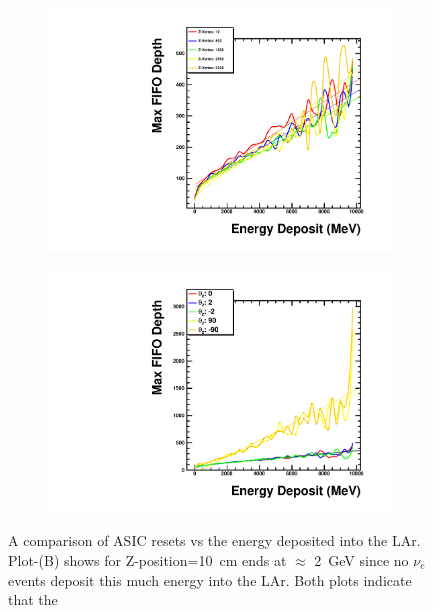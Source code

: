 \begin{figure}
\centering
\begin{subfigure}{.5\textwidth}
  \centering
  \includegraphics[width=\textwidth]{images/Const_Theta0_ASIC_EnergyDep_multigraph_pdg12_fhc.pdf}
  \caption{}
\end{subfigure}%
\begin{subfigure}{.5\textwidth}
  \centering
  \includegraphics[width=\textwidth]{images/Const_Z180_ASIC_EnergyDep_multigraph_pdg12_fhc.pdf}
  \caption{}
\end{subfigure}
\caption{A comparison of ASIC resets vs the energy deposited into the LAr.
Plot-(B) shows for Z-position=10~\unit{cm} ends at $\approx$ 2~\unit{GeV} since no $\nu_{e}$ events deposit this much energy into the LAr.
Both plots indicate that the 
}
\label{fig:compare_energy_deposit}
\end{figure}

